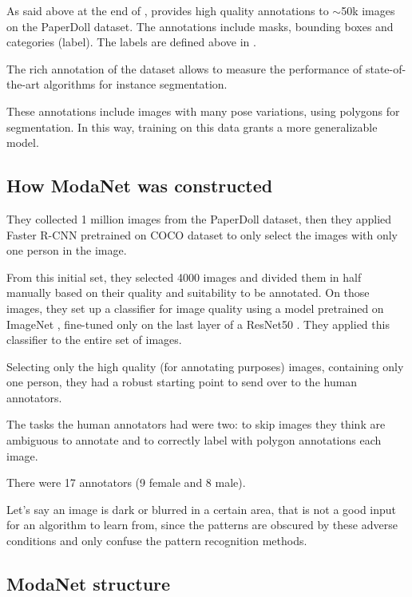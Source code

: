 As said above at the end of , \modanet provides high quality annotations to $\sim$50k images on the PaperDoll dataset. The annotations include masks, bounding boxes and categories (label). The labels are defined above in .

The rich annotation of the dataset allows to measure the performance of state-of-the-art algorithms for instance segmentation.

These annotations include images with many pose variations, using polygons for segmentation. In this way, training on this data grants a more generalizable model.

\subsection{How ModaNet was constructed}\label{s:ds-modanet-constr}

They collected 1 million images from the PaperDoll dataset, then they applied Faster R-CNN \cite{ren2015faster} pretrained on COCO dataset  to only select the images with only one person in the image.

From this initial set, they selected 4000 images and divided them in half manually based on their quality and suitability to be annotated. On those images, they set up a classifier for image quality using a model pretrained on ImageNet  , fine-tuned only on the last layer of a ResNet50 . They applied this classifier to the entire set of images.

Selecting only the high quality (for annotating purposes) images, containing only one person, they had a robust starting point to send over to the human annotators.

The tasks the human annotators had were two: to skip images they think are ambiguous to annotate and to correctly label with polygon annotations each image.

There were 17 annotators (9 female and 8 male).

Let's say an image is dark or blurred in a certain area, that is not a good input for an algorithm to learn from, since the patterns are obscured by these adverse conditions and only confuse the pattern recognition methods.


\subsection{ModaNet structure}\label{s:ds-modanet-struct}

